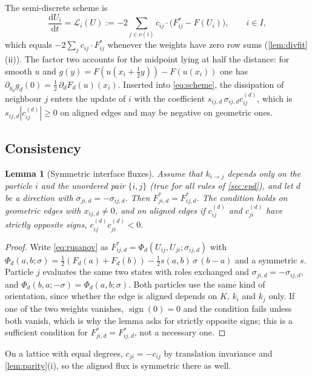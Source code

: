 \documentclass[11pt,a4paper]{article}
\theoremstyle{plain}
\newtheorem{lemma}[theorem]{Lemma}
\theoremstyle{definition}
\theoremstyle{remark}
\numberwithin{equation}{section}
\newcommand{\dd}{\mathrm{d}}
\newcommand{\nb}{\nu}
\newcommand{\Lop}{\mathcal{L}}
\newcommand{\Fs}{F^{*}}
\newcommand{\sgn}{\operatorname{sign}}
\newcommand{\ord}[2]{k_{#1\to #2}}
\begin{document}
The semi-discrete scheme is
\begin{equation}\label{eq:scheme}
\frac{\dd U_i}{\dd t} = \Lop_i(U) := -2\sum_{j\in\nb(i)} c_{ij}\cdot\big(\Fs_{ij}-F(U_i)\big),\qquad i\in I,
\end{equation}
which equals $-2\sum_j c_{ij}\cdot\Fs_{ij}$ whenever the weights have zero row sums (\cref{lem:divfit}(ii)). The factor two accounts for the midpoint lying at half the distance: for smooth $u$ and $g(y)=F(u(x_i+\tfrac12 y))-F(u(x_i))$ one has $\partial_{y_d}g_d(0)=\tfrac12\,\partial_dF_d(u)(x_i)$. Inserted into \eqref{eq:scheme}, the dissipation of neighbour $j$ enters the update of $i$ with the coefficient $s_{ij,d}\,\sigma_{ij,d}c^{(d)}_{ij}$, which is $s_{ij,d}|c^{(d)}_{ij}|\ge0$ on aligned edges and may be negative on geometric ones.

\subsection{Consistency}\label{sec:consistency}

\begin{lemma}[Symmetric interface fluxes]\label{lem:symmetry}
Assume that $\ord ij$ depends only on the particle $i$ and the unordered pair $\{i,j\}$ (true for all rules of \cref{sec:epd}), and let $d$ be a direction with $\sigma_{ji,d}=-\sigma_{ij,d}$. Then $\Fs_{ji,d}=\Fs_{ij,d}$. The condition holds on geometric edges with $x_{ij,d}\ne0$, and on aligned edges if $c^{(d)}_{ij}$ and $c^{(d)}_{ji}$ have strictly opposite signs, $c^{(d)}_{ij}c^{(d)}_{ji}<0$.
\end{lemma}

\begin{proof}
Write \eqref{eq:rusanov} as $\Fs_{ij,d}=\Phi_d(U_{ij},U_{ji};\sigma_{ij,d})$ with $\Phi_d(a,b;\sigma)=\tfrac12(F_d(a)+F_d(b))-\tfrac12 s(a,b)\,\sigma\,(b-a)$ and a symmetric $s$. Particle $j$ evaluates the same two states with roles exchanged and $\sigma_{ji,d}=-\sigma_{ij,d}$, and $\Phi_d(b,a;-\sigma)=\Phi_d(a,b;\sigma)$. Both particles use the same kind of orientation, since whether the edge is aligned depends on $K$, $k_i$ and $k_j$ only. If one of the two weights vanishes, $\sgn(0)=0$ and the condition fails unless both vanish, which is why the lemma asks for strictly opposite signs; this is a sufficient condition for $\Fs_{ji,d}=\Fs_{ij,d}$, not a necessary one.
\end{proof}

On a lattice with equal degrees, $c_{ji}=-c_{ij}$ by translation invariance and \cref{lem:parity}(i), so the aligned flux is symmetric there as well.
\end{document}
